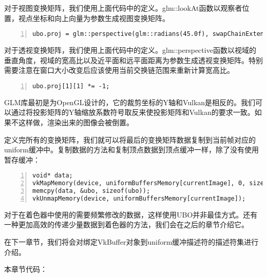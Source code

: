 \documentclass{ctexart}
\begin{document}
对于视图变换矩阵，我们使用上面代码中的定义。glm::lookAt函数以观察者位置，视点坐标和向上向量为参数生成视图变换矩阵。

\begin{lstlisting}[language={[ANSI]C},keywordstyle=\color{blue!70},commentstyle=\color{red!50!green!50!blue!50},frame=shadowbox, rulesepcolor=\color{red!20!green!20!blue!20},basicstyle=\small,numbers=left, numberstyle=\tiny,breaklines=true]
ubo.proj = glm::perspective(glm::radians(45.0f), swapChainExtent.width / (float) swapChainExtent.height, 0.1f, 10.0f);
\end{lstlisting}

对于透视变换矩阵，我们使用上面代码中的定义。glm::perspective函数以视域的垂直角度，视域的宽高比以及近平面和远平面距离为参数生成透视变换矩阵。特别需要注意在窗口大小改变后应该使用当前交换链范围来重新计算宽高比。

\begin{lstlisting}[language={[ANSI]C},keywordstyle=\color{blue!70},commentstyle=\color{red!50!green!50!blue!50},frame=shadowbox, rulesepcolor=\color{red!20!green!20!blue!20},basicstyle=\small,numbers=left, numberstyle=\tiny,breaklines=true]
ubo.proj[1][1] *= -1;
\end{lstlisting}

GLM库最初是为OpenGL设计的，它的裁剪坐标的Y轴和Vulkan是相反的。我们可以通过将投影矩阵的Y轴缩放系数符号取反来使投影矩阵和Vulkan的要求一致。如果不这样做，渲染出来的图像会被倒置。

定义完所有的变换矩阵，我们就可以将最后的变换矩阵数据复制到当前帧对应的uniform缓冲中。复制数据的方法和复制顶点数据到顶点缓冲一样，除了没有使用暂存缓冲：

\begin{lstlisting}[language={[ANSI]C},keywordstyle=\color{blue!70},commentstyle=\color{red!50!green!50!blue!50},frame=shadowbox, rulesepcolor=\color{red!20!green!20!blue!20},basicstyle=\small,numbers=left, numberstyle=\tiny,breaklines=true]
void* data;
vkMapMemory(device, uniformBuffersMemory[currentImage], 0, sizeof(ubo), 0, &data);
memcpy(data, &ubo, sizeof(ubo));
vkUnmapMemory(device, uniformBuffersMemory[currentImage]);
\end{lstlisting}

对于在着色器中使用的需要频繁修改的数据，这样使用UBO并非最佳方式。还有一种更加高效的传递少量数据到着色器的方法，我们会在之后的章节介绍它。

在下一章节，我们将会对绑定VkBuffer对象到uniform缓冲描述符的描述符集进行介绍。

本章节代码：
\end{document}
